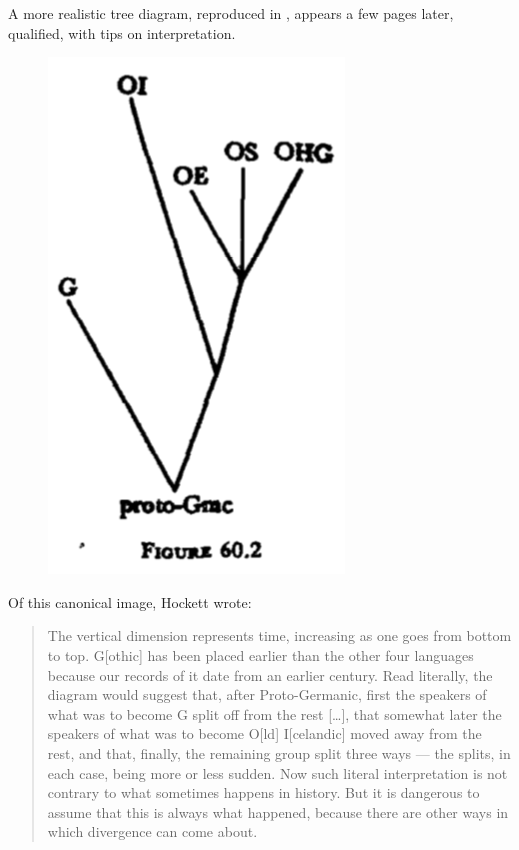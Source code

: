 \documentclass[output=paper]{langscibook}
\begin{document}
A more realistic tree diagram, reproduced in , appears a few pages later, qualified, with tips on interpretation.

\begin{figure}
    \centering
    \includegraphics[scale=0.4]{figures/hockett1958-519-new.png}
    \caption{\citet[519]{Hockett19591958}}
    \label{fig:kaplan:hockett1959519}
\end{figure}

Of this canonical image, Hockett wrote:

\begin{quotation}
The vertical dimension represents time, increasing as one goes from bottom to top. G[othic] has been placed earlier than the other four languages because our records of it date from an earlier century. Read literally, the diagram would suggest that, after Proto-Germanic, first the speakers of what was to become G split off from the rest […], that somewhat later the speakers of what was to become O[ld] I[celandic] moved away from the rest, and that, finally, the remaining group split three ways — the splits, in each case, being more or less sudden. Now such literal interpretation is not contrary to what sometimes happens in history. But it is dangerous to assume that this is always what happened, because there are other ways in which divergence can come about.  \citep[519--521]{Hockett19591958}
\end{quotation}
\end{document}
